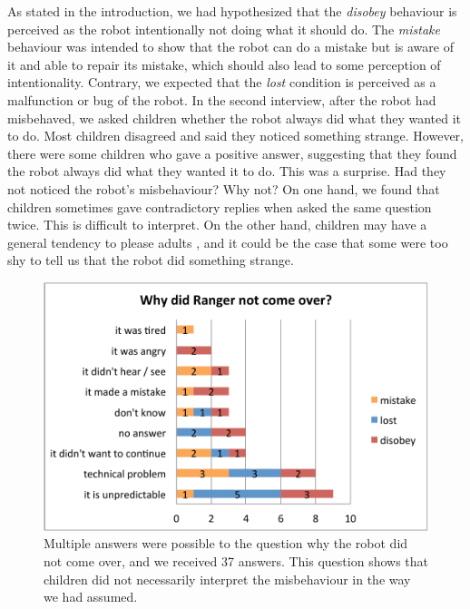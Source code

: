 \documentclass{sig-alternate}
\begin{document}
As stated in the introduction, we had hypothesized that the \textit{disobey}
behaviour is perceived as the robot intentionally not doing what it should do.
The \textit{mistake} behaviour was intended to show that the robot can do a
mistake but is aware of it and able to repair its mistake, which should also
lead to some perception of intentionality.  Contrary, we expected that the
\textit{lost} condition is perceived as a malfunction or bug of the robot.  In
the second interview, after the robot had misbehaved, we asked children whether
the robot always did what they wanted it to do. Most children disagreed and said
they noticed something strange. However, there were some children who gave a
positive answer, suggesting that they found the robot always did what they
wanted it to do. This was a surprise. Had they not noticed the robot's
misbehaviour? Why not? On one hand, we found that children sometimes gave
contradictory replies when asked the same question twice. This is difficult to
interpret. On the other hand, children may have a general tendency to please
adults \cite{leite_long-term_2013}, and it could be the case that some were too
shy to tell us that the robot did something strange.

\begin{figure}[!h]
    \centering
    \includegraphics[width=1.0\linewidth]{domino-why-misbehavior.pdf}   
    \caption[Why Did the Robot Misbehave?]{\small Multiple answers were possible
    to the question why the robot did not come over, and we received 37 answers.
    This question shows that children did not necessarily interpret the misbehaviour
    in the way we had assumed.}

    \label{fig:domino-why-misbehaviour}
\end{figure}	
\end{document}
